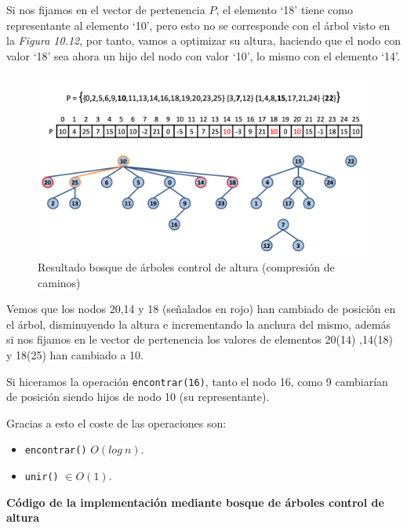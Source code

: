 \begin{itemize}
Si nos fijamos en el vector de pertenencia \(P\), el elemento `18' tiene como representante al elemento `10', pero esto no se corresponde con el árbol visto en la \textit{Figura 10.12}, por tanto, vamos a optimizar su altura, haciendo que el nodo con valor `18' sea ahora un hijo del nodo con valor `10', lo mismo con el elemento `14'.

\begin{figure}[h]
  \begin{center}
    \includegraphics[width=.9\textwidth]{assets/impPAR14.png}
  \end{center}
  \caption{Resultado bosque de árboles control de altura (compresión de caminos)}
\end{figure}

Vemos que los nodos 20,14 y 18 (señalados en rojo) han cambiado de posición en el árbol, disminuyendo la altura e incrementando la anchura del mismo, además si nos fijamos en le vector de pertenencia los valores de elementos 20(14) ,14(18) y 18(25) han cambiado a 10.

Si hiceramos la operación \texttt{encontrar(16)}, tanto el nodo 16, como 9 cambiarían de posición siendo hijos de nodo 10 (su representante).
\end{itemize}

Gracias a esto el coste de las operaciones son:
\begin{itemize}
  \item \texttt{encontrar()} \(O(log\ n)\).
  \item \texttt{unir()} \(\in O(1)\).
\end{itemize}

\textbf{Código de la implementación mediante bosque de árboles control de altura}

